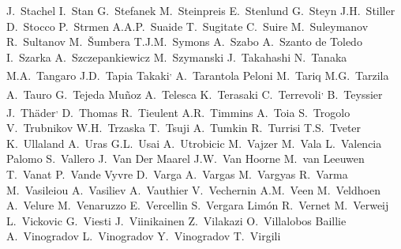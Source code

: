 \begin{flushleft}
J.~Stachel\And
I.~Stan\And
G.~Stefanek\And
M.~Steinpreis\And
E.~Stenlund\And
G.~Steyn\And
J.H.~Stiller\And
D.~Stocco\And
P.~Strmen\And
A.A.P.~Suaide\And
T.~Sugitate\And
C.~Suire\And
M.~Suleymanov\And
R.~Sultanov\And
M.~\v{S}umbera\And
T.J.M.~Symons\And
A.~Szabo\And
A.~Szanto de Toledo\And
I.~Szarka\And
A.~Szczepankiewicz\And
M.~Szymanski\And
J.~Takahashi\And
N.~Tanaka\And
M.A.~Tangaro\And
J.D.~Tapia Takaki\textsuperscript{,}\And
A.~Tarantola Peloni\And
M.~Tariq\And
M.G.~Tarzila\And
A.~Tauro\And
G.~Tejeda Mu\~{n}oz\And
A.~Telesca\And
K.~Terasaki\And
C.~Terrevoli\textsuperscript{,}\And
B.~Teyssier\And
J.~Th\"{a}der\textsuperscript{,}\And
D.~Thomas\And
R.~Tieulent\And
A.R.~Timmins\And
A.~Toia\And
S.~Trogolo\And
V.~Trubnikov\And
W.H.~Trzaska\And
T.~Tsuji\And
A.~Tumkin\And
R.~Turrisi\And
T.S.~Tveter\And
K.~Ullaland\And
A.~Uras\And
G.L.~Usai\And
A.~Utrobicic\And
M.~Vajzer\And
M.~Vala\And
L.~Valencia Palomo\And
S.~Vallero\And
J.~Van Der Maarel\And
J.W.~Van Hoorne\And
M.~van Leeuwen\And
T.~Vanat\And
P.~Vande Vyvre\And
D.~Varga\And
A.~Vargas\And
M.~Vargyas\And
R.~Varma\And
M.~Vasileiou\And
A.~Vasiliev\And
A.~Vauthier\And
V.~Vechernin\And
A.M.~Veen\And
M.~Veldhoen\And
A.~Velure\And
M.~Venaruzzo\And
E.~Vercellin\And
S.~Vergara Lim\'on\And
R.~Vernet\And
M.~Verweij\And
L.~Vickovic\And
G.~Viesti\And
J.~Viinikainen\And
Z.~Vilakazi\And
O.~Villalobos Baillie\And
A.~Vinogradov\And
L.~Vinogradov\And
Y.~Vinogradov\And
T.~Virgili\And

\end{flushleft}
